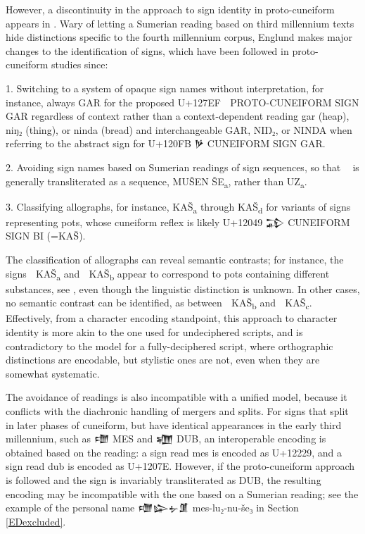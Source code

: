 However, a discontinuity in the approach to sign identity in
proto-cuneiform appears in \cite[347\psqq]{ATU2}. Wary of letting a
Sumerian reading based on third millennium texts hide distinctions
specific to the fourth millennium corpus, Englund makes major changes
to the identification of signs, which have been followed in
proto-cuneiform studies since:

1. Switching to a system of opaque sign names without interpretation,
for instance, always GAR for the proposed U+127EF {\oraccpc 𒟯} PROTO-CUNEIFORM
SIGN GAR regardless of context rather than a context-dependent reading
gar (heap), niŋ₂ (thing), or ninda (bread) and interchangeable GAR,
NIŊ₂, or NINDA when referring to the abstract sign for U+120FB {\oraccnoto 𒃻}
CUNEIFORM SIGN GAR.

2. Avoiding sign names based on Sumerian readings of sign sequences,
so that {\oraccpc 𒤤𒨢} is generally transliterated as a sequence, MUŠEN
ŠE\textsubscript{a}, rather than UZ\textsubscript{a}.

3. Classifying allographs, for instance, KAŠ\textsubscript{a} through
KAŠ\textsubscript{d} for variants of signs representing pots, whose
cuneiform reflex is likely U+12049 {\oraccnoto 𒁉} CUNEIFORM SIGN BI
(=KAŠ).

The classification of allographs can reveal semantic contrasts; for
instance, the signs {\oraccpc 𒢅} KAŠ\textsubscript{a} and {\oraccpc 𒢆}
KAŠ\textsubscript{b} appear to correspond to pots containing different
substances, see \cite[168]{Englund1998}, even though the linguistic
distinction is unknown. In other cases, no semantic contrast can be
identified, as between {\oraccpc 𒢆} KAŠ\textsubscript{b} and {\oraccpc 𒢈}
KAŠ\textsubscript{c}. Effectively, from a character encoding
standpoint, this approach to character identity is more akin to the
one used for undeciphered scripts, and is contradictory to the model
for a fully-deciphered script, where orthographic distinctions are
encodable, but stylistic ones are not, even when they are somewhat
systematic.

The avoidance of readings is also incompatible with a unified model,
because it conflicts with the diachronic handling of mergers and
splits. For signs that split in later phases of cuneiform, but have
identical appearances in the early third millennium, such as
{\oraccnoto 𒈩} MES and {\oraccnoto 𒁾} DUB, an interoperable encoding
is obtained based on the reading: a sign read mes is encoded as
U+12229, and a sign read dub is encoded as U+1207E. However, if the
proto-cuneiform approach is followed and the sign is invariably
transliterated as DUB, the resulting encoding may be incompatible with
the one based on a Sumerian reading; see the example of the personal
name {\oraccnoto 𒈩𒇽𒉡𒂠} mes-lu₂-nu-še₃ in Section
\ref{EDexcluded}.

